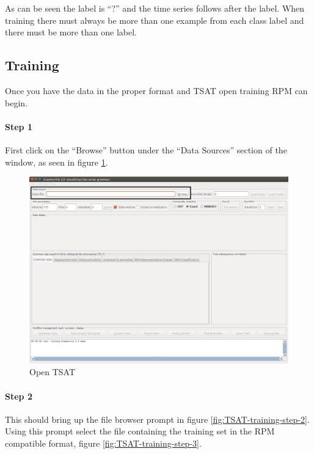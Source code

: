 \documentclass[letterpaper, 12pt]{article}
\begin{document}
As can be seen the label is ``?'' and the time series follows after the label.  When training there must always be more than one example from each class label and there must be more than one label.

\subsection{Training}
\label{RPMTrain}

Once you have the data in the proper format and TSAT open training RPM can begin.

\paragraph{Step 1}
First click on the ``Browse'' button under the ``Data Sources'' section of the window, as seen in figure \ref{fig:TSAT-training-step-1}. 

\begin{figure}[h]
	\includegraphics[width=\textwidth]{TSAT-training-step-1}
	\caption{Open TSAT}
	\label{fig:TSAT-training-step-1}
\end{figure}
\newpage
\paragraph{Step 2}
This should bring up the file browser prompt in figure \ref{fig:TSAT-training-step-2}. Using this prompt select the file containing the training set in the RPM compatible format, figure \ref{fig:TSAT-training-step-3}.
\end{document}
